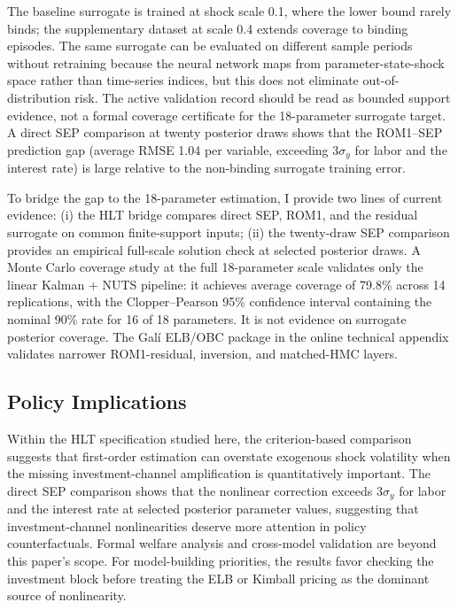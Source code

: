 \documentclass[12pt]{article}
\theoremstyle{plain}
\theoremstyle{definition}
\theoremstyle{remark}
\begin{document}
The baseline surrogate is trained at shock scale 0.1, where the lower bound rarely binds; the supplementary dataset at scale 0.4 extends coverage to binding episodes. The same surrogate can be evaluated on different sample periods without retraining because the neural network maps from parameter-state-shock space rather than time-series indices, but this does not eliminate out-of-distribution risk. The active validation record should be read as bounded support evidence, not a formal coverage certificate for the 18-parameter surrogate target. A direct SEP comparison at twenty posterior draws shows that the ROM1--SEP prediction gap (average RMSE 1.04 per variable, exceeding $3\sigma_y$ for labor and the interest rate) is large relative to the non-binding surrogate training error.

To bridge the gap to the 18-parameter estimation, I provide two lines of current evidence: (i) the HLT bridge compares direct SEP, ROM1, and the residual surrogate on common finite-support inputs; (ii) the twenty-draw SEP comparison provides an empirical full-scale solution check at selected posterior draws. A Monte Carlo coverage study at the full 18-parameter scale validates only the linear Kalman + NUTS pipeline: it achieves average coverage of 79.8\% across 14 replications, with the Clopper--Pearson 95\% confidence interval containing the nominal 90\% rate for 16 of 18 parameters. It is not evidence on surrogate posterior coverage. The Gal\'i ELB/OBC package in the online technical appendix validates narrower ROM1-residual, inversion, and matched-HMC layers.

\subsection{Policy Implications}

Within the HLT specification studied here, the criterion-based comparison suggests that first-order estimation can overstate exogenous shock volatility when the missing investment-channel amplification is quantitatively important. The direct SEP comparison shows that the nonlinear correction exceeds $3\sigma_y$ for labor and the interest rate at selected posterior parameter values, suggesting that investment-channel nonlinearities deserve more attention in policy counterfactuals. Formal welfare analysis and cross-model validation are beyond this paper's scope. For model-building priorities, the results favor checking the investment block before treating the ELB or Kimball pricing as the dominant source of nonlinearity.
\end{document}
